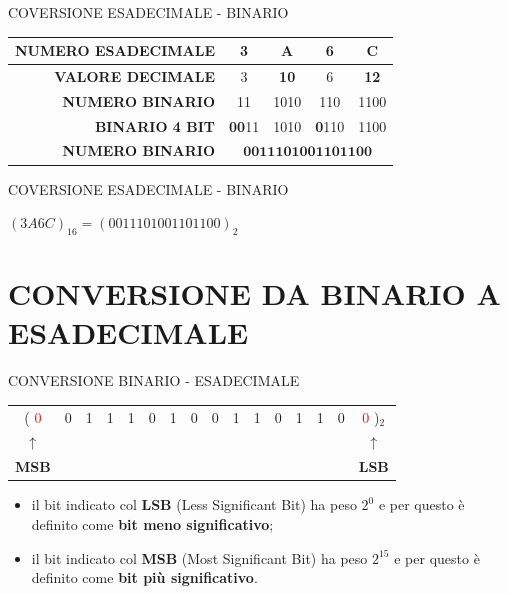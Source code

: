 \documentclass[aspectratio=1610]{beamer}
\begin{document}
\begin{frame}{COVERSIONE ESADECIMALE - BINARIO}
    \centering
    \begin{tabular}{r||c|c|c|c}
        \textbf{NUMERO ESADECIMALE} & 3 & \textbf{A} & 6 & \textbf{C} \\
        \hline
        \pause
        \textbf{VALORE DECIMALE} & 3 & \textbf{10} & 6 & \textbf{12} \\
        \hline
        \pause
        \textbf{NUMERO BINARIO} & 11 & 1010 & 110 & 1100 \\
        \hline
        \pause
        \textbf{BINARIO 4 BIT} & \textbf{00}11 & 1010 & \textbf{0}110 & 1100 \\
        \hline
        \pause
        \textbf{NUMERO BINARIO} & \multicolumn{4}{c}{$\mathbf{0011101001101100}$} \\
    \end{tabular}
    \begin{alertblock}{COVERSIONE ESADECIMALE - BINARIO}
        \begin{minipage}{0.98\linewidth}
            \centering
            \huge
            $(3A6C)_{16} = (0011101001101100)_{2}$
        \end{minipage}
    \end{alertblock}
\end{frame}

\section{CONVERSIONE DA BINARIO A ESADECIMALE}

\begin{frame}{CONVERSIONE BINARIO - ESADECIMALE}
    \centering
    \huge
    \begin{tabular}{c c c c c c c c c c c c c c c c}
        ( \textcolor{red}{0} & 0 & 1 & 1 & 1 & 0 & 1 & 0 & 0 & 1 & 1 & 0 & 1 & 1 & 0 & \textcolor{red}{0} )$_2$ \\
        \pause
        $\uparrow$ & & & & & & & & & & & & & & & $\uparrow$ \\
        \normalsize{\textbf{MSB}} & & & & & & & & & & & & & & & \normalsize{\textbf{LSB}} \\
    \end{tabular}
    \normalsize
    \begin{itemize}
        \item il bit indicato col \textbf{LSB} (Less Significant Bit) ha peso $2^0$ e per questo è 
        definito come \textbf{bit meno significativo};
        \item il bit indicato col \textbf{MSB} (Most Significant Bit) ha peso $2^{15}$ e per questo è 
        definito come \textbf{bit più significativo}.
    \end{itemize}
\end{frame}
\end{document}
